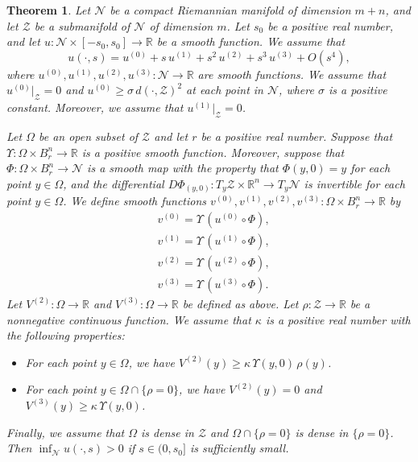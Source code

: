 \documentclass[11pt]{amsart}
\newtheorem{theorem}{Theorem}[section]
\theoremstyle{definition}
\begin{document}
\begin{theorem} 
\label{positivity.manifold.version}
Let $\mathcal{N}$ be a compact Riemannian manifold of dimension $m+n$, and let $\mathcal{Z}$ be a submanifold of $\mathcal{N}$ of dimension $m$. Let $s_0$ be a positive real number, and let $u: \mathcal{N} \times [-s_0,s_0] \to \mathbb{R}$ be a smooth function. We assume that 
\[u(\cdot,s) = u^{(0)} + s \, u^{(1)} + s^2 \, u^{(2)} + s^3 \, u^{(3)} + O(s^4),\]
where $u^{(0)},u^{(1)},u^{(2)},u^{(3)}: \mathcal{N} \to \mathbb{R}$ are smooth functions. We assume that $u^{(0)}|_{\mathcal{Z}} = 0$ and $u^{(0)} \geq \sigma \, d(\cdot,\mathcal{Z})^2$ at each point in $\mathcal{N}$, where $\sigma$ is a positive constant. Moreover, we assume that $u^{(1)}|_{\mathcal{Z}} = 0$.

Let $\Omega$ be an open subset of $\mathcal{Z}$ and let $r$ be a positive real number. Suppose that $\Upsilon: \Omega \times B_r^n \to \mathbb{R}$ is a positive smooth function. Moreover, suppose that $\Phi: \Omega \times B_r^n \to \mathcal{N}$ is a smooth map with the property that $\Phi(y,0) = y$ for each point $y \in \Omega$, and the differential $D\Phi_{(y,0)}: T_y \mathcal{Z} \times \mathbb{R}^n \to T_y \mathcal{N}$ is invertible for each point $y \in \Omega$. We define smooth functions $v^{(0)},v^{(1)},v^{(2)},v^{(3)}: \Omega \times B_r^n \to \mathbb{R}$ by 
\begin{align*} 
&v^{(0)} = \Upsilon \, (u^{(0)} \circ \Phi), \\ 
&v^{(1)} = \Upsilon \, (u^{(1)} \circ \Phi), \\ 
&v^{(2)} = \Upsilon \, (u^{(2)} \circ \Phi), \\ 
&v^{(3)} = \Upsilon \, (u^{(3)} \circ \Phi). 
\end{align*} 
Let $V^{(2)}: \Omega \to \mathbb{R}$ and $V^{(3)}: \Omega \to \mathbb{R}$ be defined as above. Let $\rho: \mathcal{Z} \to \mathbb{R}$ be a nonnegative continuous function. We assume that $\kappa$ is a positive real number with the following properties:
\begin{itemize} 
\item For each point $y \in \Omega$, we have $V^{(2)}(y) \geq \kappa \, \Upsilon(y,0) \, \rho(y)$. 
\item For each point $y \in \Omega \cap \{\rho = 0\}$, we have $V^{(2)}(y) = 0$ and $V^{(3)}(y) \geq \kappa \, \Upsilon(y,0)$.
\end{itemize} 
Finally, we assume that $\Omega$ is dense in $\mathcal{Z}$ and $\Omega \cap \{\rho = 0\}$ is dense in $\{\rho = 0\}$. Then $\inf_{\mathcal{N}} u(\cdot,s) > 0$ if $s \in (0,s_0]$ is sufficiently small.
\end{theorem}
\end{document}

